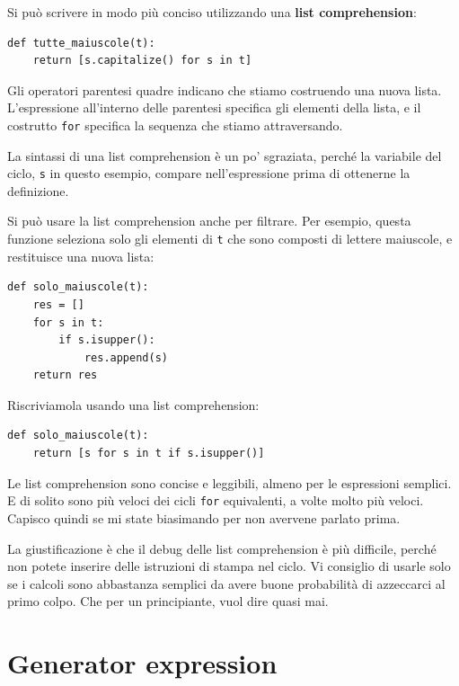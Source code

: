 \documentclass[10pt]{book}
\begin{document}
Si può scrivere in modo più conciso utilizzando una {\bf list comprehension}:

\begin{verbatim}
def tutte_maiuscole(t):
    return [s.capitalize() for s in t]
\end{verbatim}

Gli operatori parentesi quadre indicano che stiamo costruendo una nuova lista. L'espressione all'interno delle parentesi specifica gli elementi della lista, e il costrutto {\tt for} specifica la sequenza che stiamo attraversando.

La sintassi di una list comprehension è un po' sgraziata, perché la variabile del ciclo, {\tt s} in questo esempio, compare nell'espressione prima di ottenerne la definizione.

Si può usare la list comprehension anche per filtrare. Per esempio, questa funzione seleziona solo gli elementi di {\tt t} che sono composti di lettere maiuscole, e restituisce una nuova lista:

\begin{verbatim}
def solo_maiuscole(t):
    res = []
    for s in t:
        if s.isupper():
            res.append(s)
    return res
\end{verbatim}

Riscriviamola usando una list comprehension:

\begin{verbatim}
def solo_maiuscole(t):
    return [s for s in t if s.isupper()]
\end{verbatim}

Le list comprehension sono concise e leggibili, almeno per le espressioni semplici. E di solito sono più veloci dei cicli \verb'for' equivalenti, a volte molto più veloci. Capisco quindi se mi state biasimando per non avervene parlato prima.

La giustificazione è che il debug delle list comprehension è più difficile, perché non potete inserire delle istruzioni di stampa nel ciclo. Vi consiglio di usarle solo se i calcoli sono abbastanza semplici da avere buone probabilità di azzeccarci al primo colpo. Che per un principiante, vuol dire quasi mai.


\section{Generator expression}
\end{document}
